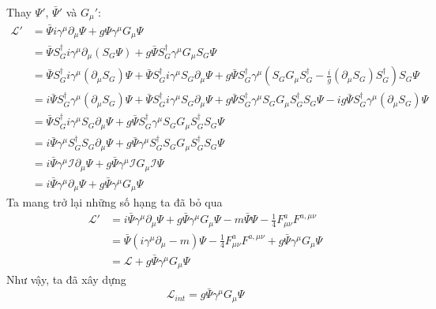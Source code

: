 \documentclass[14Pt]{report}
\begin{document}
	Thay $\Psi'$, $\bar{\Psi}'$ và $G_\mu'$:
\begin{align*}
				\mathcal{L}'&=\bar{\Psi}i\gamma^\mu \partial_\mu\Psi+g\Psi\gamma^\mu G_\mu\Psi\\
	&=\bar{\Psi}S_G^\dagger i\gamma^\mu \partial_\mu (S_G\Psi)+g\bar{\Psi}S_G^\dagger\gamma^\mu G_\mu  S_G\Psi\\
	&=\bar{\Psi}S_G^\dagger i\gamma^\mu (\partial_\mu S_G)\Psi+\bar{\Psi}S_G^\dagger i\gamma^\mu S_G\partial_\mu\Psi+g\bar{\Psi}S_G^\dagger\gamma^\mu (S_GG_\mu S_G^\dagger-\frac{i}{g}(\partial_\mu S_G)S_G^\dagger)  S_G\Psi\\
	&=i\bar{\Psi}S_G^\dagger \gamma^\mu (\partial_\mu S_G)\Psi+\bar{\Psi}S_G^\dagger i\gamma^\mu S_G\partial_\mu\Psi+g\bar{\Psi}S_G^\dagger\gamma^\mu S_GG_\mu S_G^\dagger S_G\Psi-ig\bar{\Psi}S_G^\dagger \gamma^\mu (\partial_\mu S_G)\Psi\\
	&=\bar{\Psi}S_G^\dagger i\gamma^\mu S_G\partial_\mu\Psi+g\bar{\Psi}S_G^\dagger\gamma^\mu S_GG_\mu S_G^\dagger S_G\Psi\\
	&=i\bar{\Psi} \gamma^\mu S_G^\dagger S_G\partial_\mu\Psi+g\bar{\Psi}\gamma^\mu S_G^\dagger S_GG_\mu S_G^\dagger S_G\Psi\\
	&=i\bar{\Psi} \gamma^\mu \mathcal{I}\partial_\mu\Psi+g\bar{\Psi}\gamma^\mu \mathcal{I}G_\mu \mathcal{I}\Psi\\
	&=i\bar{\Psi} \gamma^\mu \partial_\mu\Psi+g\bar{\Psi}\gamma^\mu G_\mu \Psi
\end{align*}
	Ta mang trở lại những số hạng ta đã bỏ qua 
	\begin{align*}
		\mathcal{L}'&=i\bar{\Psi} \gamma^\mu \partial_\mu\Psi+g\bar{\Psi}\gamma^\mu G_\mu \Psi-m\bar{\Psi}\Psi-\frac{1}{4}F_{\mu\nu}^aF^{a,\mu\nu}\\
		&=\bar{\Psi}\left(i\gamma^\mu\partial_\mu-m\right)\Psi-\frac{1}{4}F_{\mu\nu}^aF^{a,\mu\nu}+g\bar{\Psi}\gamma^\mu G_\mu \Psi\\
		&=\mathcal{L}+g\bar{\Psi}\gamma^\mu G_\mu \Psi
	\end{align*}
	Như vậy, ta đã xây dựng $$\mathcal{L}_{int}=g\bar{\Psi}\gamma^\mu G_\mu \Psi$$
\end{document}

